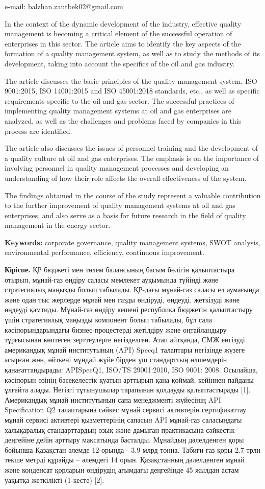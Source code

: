 e-mail: balzhan.zautbek02@gmail.com

In the context of the dynamic development of the industry, effective
quality management is becoming a critical element of the successful
operation of enterprises in this sector. The article aims to identify
the key aspects of the formation of a quality management system, as well
as to study the methods of its development, taking into account the
specifics of the oil and gas industry.

The article discusses the basic principles of the quality management
system, ISO 9001:2015, ISO 14001:2015 and ISO 45001:2018 standards,
etc., as well as specific requirements specific to the oil and gas
sector. The successful practices of implementing quality management
systems at oil and gas enterprises are analyzed, as well as the
challenges and problems faced by companies in this process are
identified.

The article also discusses the issues of personnel training and the
development of a quality culture at oil and gas enterprises. The
emphasis is on the importance of involving personnel in quality
management processes and developing an understanding of how their role
affects the overall effectiveness of the system.

The findings obtained in the course of the study represent a valuable
contribution to the further improvement of quality management systems at
oil and gas enterprises, and also serve as a basis for future research
in the field of quality management in the energy sector.

{\bfseries Keywords:} corporate governance, quality management systems,
SWOT analysis, environmental performance, efficiency, continuous
improvement.

{\bfseries Кіріспе.} ҚР бюджеті мен төлем балансының басым бөлігін
қалыптастыра отырып, мұнай-газ өндіру саласы мемлекет ауқымында түйінді
және стратегиялық маңызды болып табылады. ҚР-дағы мұнай-газ саласы ел
аумағында және одан тыс жерлерде мұнай мен газды өндіруді, өңдеуді,
жеткізуді және өңдеуді қамтиды. Мұнай-газ өндіру кешені республика
бюджетін қалыптастыру үшін стратегиялық маңызды компонент болып
табылады, бұл сала кәсіпорындарындағы бизнес-процестерді жетілдіру және
оңтайландыру тұрғысынан көптеген зерттеулерге негізделген. Атап
айтқанда, СМЖ енгізуді американдық мұнай институтының (API) Specq1
талаптары негізінде жүзеге асырған жөн, өйткені мұндай жүйе бірден үш
стандарттың өлшемдерін қанағаттандырады: APISpecQ1, ISO/TS 29001:2010,
ISO 9001: 2008. Осылайша, кәсіпорын өзінің бәсекелестік қуатын арттырып
қана қоймай, кейіннен пайданы ұлғайта алады. Негізгі тұтынушылар
тарапынан қолдауды қалыптастырады {[}1{]}. Американдық мұнай
институтының сапа менеджменті жүйесінің API Specification Q2 талаптарына
сәйкес мұнай сервисі активтерін сертификаттау мұнай сервисі активтері
қызметтерінің сапасын API мұнай-газ саласындағы халықаралық
стандарттардың озық және дамыған практикасына сәйкестік деңгейіне дейін
арттыру мақсатында басталды. Мұнайдың дәлелденген қоры бойынша Қазақстан
әлемде 12-орында - 3.9 млрд тонна. Табиғи газ қоры 2.7 трлн текше метрді
құрайды -- әлемдегі 14 орын. Қазақстанның дәлелденген мұнай және
конденсат қорларын өндірудің ағымдағы деңгейінде 45 жылдан астам уақытқа
жеткілікті (1-кесте) {[}2{]}.

